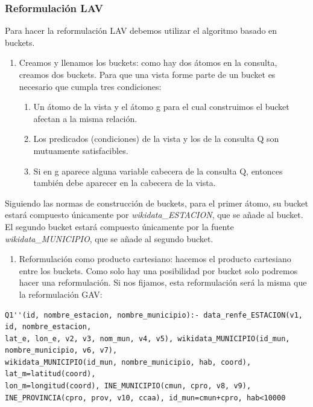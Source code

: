 \subsubsection{Reformulación LAV}\label{reformulaciuxf3n-lav}

Para hacer la reformulación LAV debemos utilizar el algoritmo basado en
buckets.

\begin{enumerate}
\def\labelenumi{\arabic{enumi}.}
\tightlist
\item
  Creamos y llenamos los buckets: como hay dos átomos en la consulta,
  creamos dos buckets. Para que una vista forme parte de un bucket es
  necesario que cumpla tres condiciones:

  \begin{enumerate}
  \def\labelenumii{\alph{enumii}.}
  \tightlist
  \item
    Un átomo de la vista y el átomo g para el cual construimos el bucket
    afectan a la misma relación.
  \item
    Los predicados (condiciones) de la vista y los de la consulta Q son
    mutuamente satisfacibles.
  \item
    Si en g aparece alguna variable cabecera de la consulta Q, entonces
    también debe aparecer en la cabecera de la vista.
  \end{enumerate}
\end{enumerate}

Siguiendo las normas de construcción de buckets, para el primer átomo,
su bucket estará compuesto únicamente por \emph{wikidata\_ESTACION}, que
se añade al bucket. El segundo bucket estará compuesto únicamente por la
fuente \emph{wikidata\_MUNICIPIO}, que se añade al segundo bucket.

\begin{enumerate}
\def\labelenumi{\arabic{enumi}.}
\setcounter{enumi}{1}
\tightlist
\item
  Reformulación como producto cartesiano: hacemos el producto cartesiano
  entre los buckets. Como solo hay una posibilidad por bucket solo
  podremos hacer una reformulación. Si nos fijamos, esta reformulación
  será la misma que la reformulación GAV:
\end{enumerate}

\begin{verbatim}
Q1''(id, nombre_estacion, nombre_municipio):- data_renfe_ESTACION(v1, id, nombre_estacion, 
lat_e, lon_e, v2, v3, nom_mun, v4, v5), wikidata_MUNICIPIO(id_mun, nombre_municipio, v6, v7), 
wikidata_MUNICIPIO(id_mun, nombre_municipio, hab, coord), lat_m=latitud(coord), 
lon_m=longitud(coord), INE_MUNICIPIO(cmun, cpro, v8, v9), 
INE_PROVINCIA(cpro, prov, v10, ccaa), id_mun=cmun+cpro, hab<10000
\end{verbatim}


